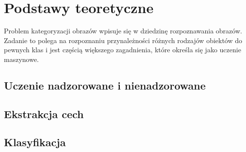 \chapter{Podstawy teoretyczne}

Problem kategoryzacji obrazów wpisuje się w dziedzinę rozpoznawania obrazów. Zadanie to polega na rozpoznaniu przynależności różnych rodzajów obiektów do pewnych klas i jest częścią większego zagadnienia, które określa się jako uczenie maszynowe.



\section{Uczenie nadzorowane i nienadzorowane}


\section{Ekstrakcja cech}

\section{Klasyfikacja}
